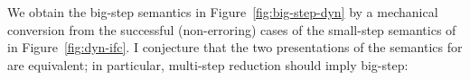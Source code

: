 
We obtain the big-step semantics in Figure~\ref{fig:big-step-dyn} by a
mechanical conversion from the successful (non-erroring) cases of the
small-step semantics of \DynIFC in Figure~\ref{fig:dyn-ifc}. I conjecture that
the two presentations of the semantics for \DynIFC are equivalent; in
particular, multi-step reduction should imply big-step:

